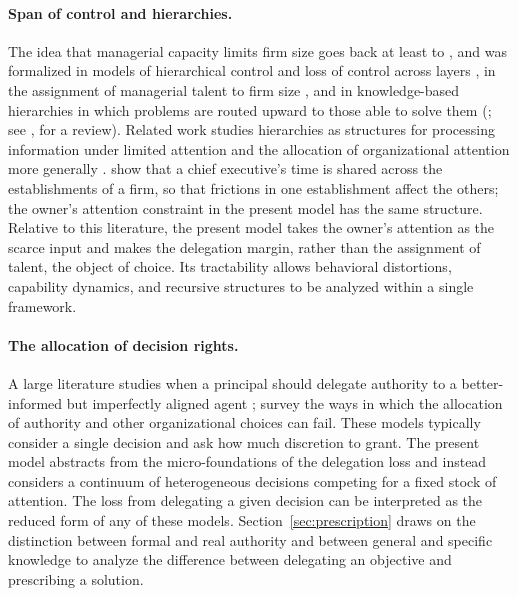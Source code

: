 \documentclass[11pt,a4paper]{article}
\theoremstyle{plain}
\begin{document}
\paragraph{Span of control and hierarchies.} The idea that managerial capacity limits firm size goes back at least to \citet{penrose1959}, and was formalized in models of hierarchical control and loss of control across layers \citep{williamson1967,calvo1978}, in the assignment of managerial talent to firm size \citep{lucas1978,rosen1982}, and in knowledge-based hierarchies in which problems are routed upward to those able to solve them (\citealp{garicano2000,garicano2006}; see \citealp{garicano2015}, for a review). Related work studies hierarchies as structures for processing information under limited attention \citep{geanakoplos1991,radner1993} and the allocation of organizational attention more generally \citep{dessein2016,halac2016,dessein2021}. \citet{gumpert2022} show that a chief executive's time is shared across the establishments of a firm, so that frictions in one establishment affect the others; the owner's attention constraint in the present model has the same structure. Relative to this literature, the present model takes the owner's attention as the scarce input and makes the delegation margin, rather than the assignment of talent, the object of choice. Its tractability allows behavioral distortions, capability dynamics, and recursive structures to be analyzed within a single framework.

\paragraph{The allocation of decision rights.} A large literature studies when a principal should delegate authority to a better-informed but imperfectly aligned agent \citep{holmstrom1984,aghion1997,dessein2002,alonso2008}; \citet{garicano2016} survey the ways in which the allocation of authority and other organizational choices can fail. These models typically consider a single decision and ask how much discretion to grant. The present model abstracts from the micro-foundations of the delegation loss and instead considers a continuum of heterogeneous decisions competing for a fixed stock of attention. The loss from delegating a given decision can be interpreted as the reduced form of any of these models. Section~\ref{sec:prescription} draws on the distinction between formal and real authority \citep{aghion1997} and between general and specific knowledge \citep{jensen1992} to analyze the difference between delegating an objective and prescribing a solution.
\end{document}
